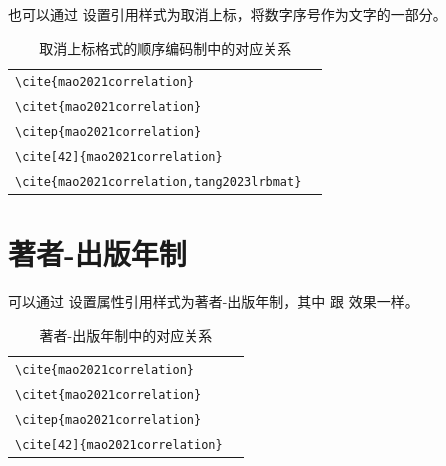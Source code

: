 \documentclass[
    report,     %
    oneside,    %
    UTF8,       %
    zihao=-4    %
]{config} %
\begin{document}
也可以通过  设置引用样式为取消上标，将数字序号作为文字的一部分。


\begin{table}[H]
  \centering
  \caption{取消上标格式的顺序编码制中的对应关系}
      \begin{tabular}{l@{\quad$\Rightarrow$\quad}l}
      \verb|\cite{mao2021correlation}| & \cite{mao2021correlation} \\
      \verb|\citet{mao2021correlation}| & \citet{mao2021correlation} \\
      \verb|\citep{mao2021correlation}| & \citep{mao2021correlation} \\
      \verb|\cite[42]{mao2021correlation}| & \cite[42]{mao2021correlation}  \\
      \verb|\cite{mao2021correlation,tang2023lrbmat}| & \cite{mao2021correlation,tang2023lrbmat} \\
      \end{tabular}
\end{table}
\vspace{-0.7em}  %

\section{著者-出版年制}

可以通过  设置属性引用样式为著者-出版年制，其中  
跟  效果一样。


\begin{table}[H]
  \centering
  \caption{著者-出版年制中的对应关系}
      \begin{tabular}{l@{\quad$\Rightarrow$\quad}l}
      \verb|\cite{mao2021correlation}| & \cite{mao2021correlation} \\
      \verb|\citet{mao2021correlation}| & \citet{mao2021correlation} \\
      \verb|\citep{mao2021correlation}| & \citep{mao2021correlation} \\
      \verb|\cite[42]{mao2021correlation}| & \cite[42]{mao2021correlation}  \\
      \end{tabular}
\end{table}
\vspace{-0.5em}  %
\end{document}
